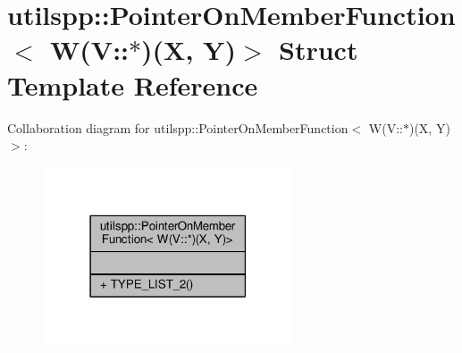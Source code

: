 \hypertarget{structutilspp_1_1PointerOnMemberFunction_3_01W_07V_1_1_5_08_07X_00_01Y_08_4}{\section{utilspp\-:\-:Pointer\-On\-Member\-Function$<$ W(V\-:\-:$\ast$)(X, Y)$>$ Struct Template Reference}
\label{structutilspp_1_1PointerOnMemberFunction_3_01W_07V_1_1_5_08_07X_00_01Y_08_4}
}


Collaboration diagram for utilspp\-:\-:Pointer\-On\-Member\-Function$<$ W(V\-:\-:$\ast$)(X, Y)$>$\-:\nopagebreak
\begin{figure}[H]
\begin{center}
\leavevmode
\includegraphics[width=210pt]{structutilspp_1_1PointerOnMemberFunction_3_01W_07V_1_1_5_08_07X_00_01Y_08_4__coll__graph}
\end{center}
\end{figure}

